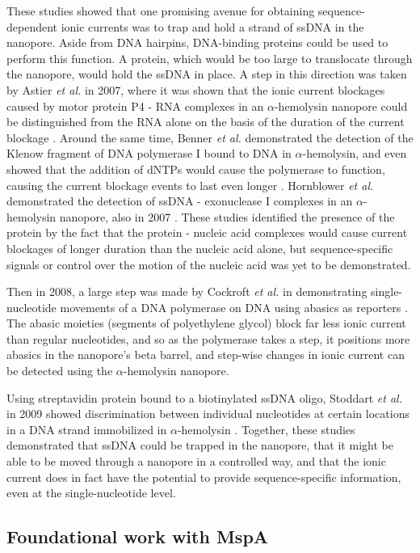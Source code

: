 These studies showed that one promising avenue for obtaining sequence-dependent ionic currents was to trap and hold a strand of ssDNA in the nanopore.  Aside from DNA hairpins, DNA-binding proteins could be used to perform this function.  A protein, which would be too large to translocate through the nanopore, would hold the ssDNA in place.  A step in this direction was taken by Astier \textit{et al.} in 2007, where it was shown that the ionic current blockages caused by motor protein P4 - RNA complexes in an $\alpha$-hemolysin nanopore could be distinguished from the RNA alone on the basis of the duration of the current blockage \citep{Astier2007}.  Around the same time, Benner \textit{et al.} demonstrated the detection of the Klenow fragment of DNA polymerase I bound to DNA in $\alpha$-hemolysin, and even showed that the addition of dNTPs would cause the polymerase to function, causing the current blockage events to last even longer \citep{Benner2007}.  Hornblower \textit{et al.} demonstrated the detection of ssDNA - exonuclease I complexes in an $\alpha$-hemolysin nanopore, also in 2007 \citep{Hornblower2007}.  These studies identified the presence of the protein by the fact that the protein - nucleic acid complexes would cause current blockages of longer duration than the nucleic acid alone, but sequence-specific signals or control over the motion of the nucleic acid was yet to be demonstrated.

Then in 2008, a large step was made by Cockroft \textit{et al.} in demonstrating single-nucleotide movements of a DNA polymerase on DNA using abasics as reporters \citep{Cockroft2008}.  The abasic moieties (segments of polyethylene glycol) block far less ionic current than regular nucleotides, and so as the polymerase takes a step, it positions more abasics in the nanopore's beta barrel, and step-wise changes in ionic current can be detected using the $\alpha$-hemolysin nanopore.

Using streptavidin protein bound to a biotinylated ssDNA oligo, Stoddart \textit{et al.} in 2009 showed discrimination between individual nucleotides at certain locations in a DNA strand immobilized in $\alpha$-hemolysin \citep{Stoddart2009}.  Together, these studies demonstrated that ssDNA could be trapped in the nanopore, that it might be able to be moved through a nanopore in a controlled way, and that the ionic current does in fact have the potential to provide sequence-specific information, even at the single-nucleotide level.

\subsection{Foundational work with MspA}

